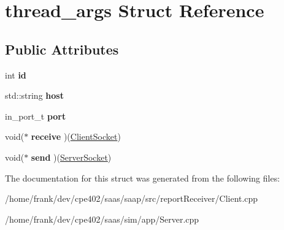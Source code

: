 \hypertarget{structthread__args}{}\section{thread\+\_\+args Struct Reference}
\label{structthread__args}
\subsection*{Public Attributes}
\begin{DoxyCompactItemize}
\item 
\hypertarget{structthread__args_a6322b3468fd88f8f49977a6439e9f352}{}int {\bfseries id}\label{structthread__args_a6322b3468fd88f8f49977a6439e9f352}

\item 
\hypertarget{structthread__args_a2993a11951278a8e5277b45ac9547d00}{}std\+::string {\bfseries host}\label{structthread__args_a2993a11951278a8e5277b45ac9547d00}

\item 
\hypertarget{structthread__args_aec0f2f19bebb0641a7a635ad70376db3}{}in\+\_\+port\+\_\+t {\bfseries port}\label{structthread__args_aec0f2f19bebb0641a7a635ad70376db3}

\item 
\hypertarget{structthread__args_a44ed1c0214dc37f162e77dbe0f9dd5fb}{}void($\ast$ {\bfseries receive} )(\hyperlink{class_client_socket}{Client\+Socket})\label{structthread__args_a44ed1c0214dc37f162e77dbe0f9dd5fb}

\item 
\hypertarget{structthread__args_a32fa5ab6ec80d4ee564930d62027fd93}{}void($\ast$ {\bfseries send} )(\hyperlink{class_server_socket}{Server\+Socket})\label{structthread__args_a32fa5ab6ec80d4ee564930d62027fd93}

\end{DoxyCompactItemize}


The documentation for this struct was generated from the following files\+:\begin{DoxyCompactItemize}
\item 
/home/frank/dev/cpe402/saas/saap/src/report\+Receiver/Client.\+cpp\item 
/home/frank/dev/cpe402/saas/sim/app/Server.\+cpp\end{DoxyCompactItemize}
